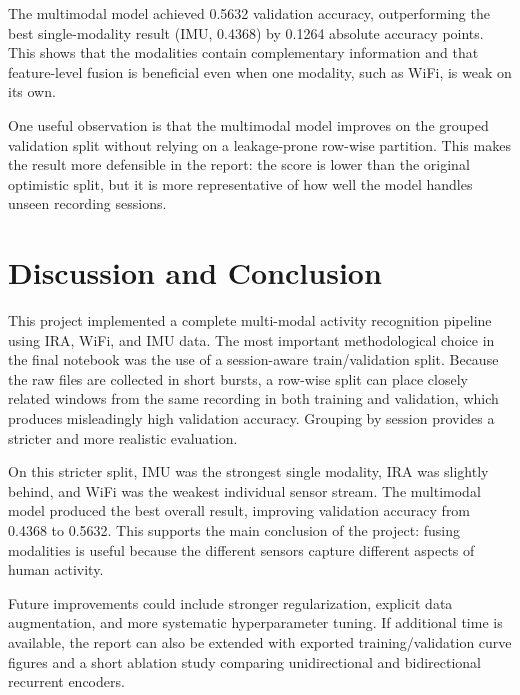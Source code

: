 The multimodal model achieved 0.5632 validation accuracy, outperforming the best single-modality result (IMU, 0.4368) by 0.1264 absolute accuracy points. This shows that the modalities contain complementary information and that feature-level fusion is beneficial even when one modality, such as WiFi, is weak on its own.

One useful observation is that the multimodal model improves on the grouped validation split without relying on a leakage-prone row-wise partition. This makes the result more defensible in the report: the score is lower than the original optimistic split, but it is more representative of how well the model handles unseen recording sessions.

\section{Discussion and Conclusion}
This project implemented a complete multi-modal activity recognition pipeline using IRA, WiFi, and IMU data. The most important methodological choice in the final notebook was the use of a session-aware train/validation split. Because the raw files are collected in short bursts, a row-wise split can place closely related windows from the same recording in both training and validation, which produces misleadingly high validation accuracy. Grouping by session provides a stricter and more realistic evaluation.

On this stricter split, IMU was the strongest single modality, IRA was slightly behind, and WiFi was the weakest individual sensor stream. The multimodal model produced the best overall result, improving validation accuracy from 0.4368 to 0.5632. This supports the main conclusion of the project: fusing modalities is useful because the different sensors capture different aspects of human activity.

Future improvements could include stronger regularization, explicit data augmentation, and more systematic hyperparameter tuning. If additional time is available, the report can also be extended with exported training/validation curve figures and a short ablation study comparing unidirectional and bidirectional recurrent encoders.
